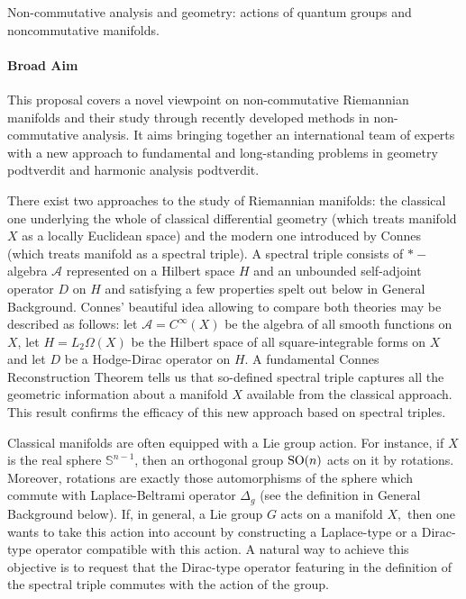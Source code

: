 \documentclass{article}
\newcommand{\archeading}[1]{\vspace{.3cm} \noindent{\bfseries #1} \vspace{.1cm}   }
\begin{document}
\parindent=20pt
\pagestyle{empty}
\newpage


\archeading{Project Title} Non-commutative analysis and geometry: actions of quantum groups and noncommutative manifolds.

\bigskip\archeading{Aims and Background}

\paragraph*{Broad Aim} This proposal covers a novel viewpoint on non-commutative Riemannian manifolds and their study through recently developed methods in non-commutative analysis. It aims bringing together an international team of experts with a new approach to fundamental and long-standing problems in geometry {\color{red} podtverdit} and harmonic analysis {\color{red} podtverdit}.

There exist two approaches to the study of Riemannian manifolds: the classical one underlying the whole of classical differential geometry (which treats manifold $X$ as a locally Euclidean space) and the modern one introduced by Connes (which treats manifold as a spectral triple).  A spectral triple consists of $\ast-$algebra $\mathcal{A}$ represented on a Hilbert space $H$ and an unbounded self-adjoint operator $D$ on $H$ and satisfying a few properties spelt out below in General Background. Connes' beautiful idea \cite{Connes-book} allowing to compare both theories may be described as follows: let  $\mathcal{A}=C^{\infty}(X)$ be the algebra of all smooth functions on $X$, let $H=L_2\Omega(X)$ be the Hilbert space of all square-integrable forms on $X$ and let $D$ be a Hodge-Dirac operator \cite{BGV} on $H$. A fundamental Connes Reconstruction Theorem \cite{Connes-reconstruction} tells us that so-defined spectral triple captures all the geometric information about a manifold $X$ available from the classical approach. This result confirms the efficacy of this new approach based on spectral triples.

Classical manifolds are often equipped with a Lie group action. For instance, if $X$ is the real sphere $\mathbb{S}^{n-1}$, then an orthogonal group ${\rm SO}(n)$ acts on it by rotations. Moreover, rotations are exactly those automorphisms of the sphere which commute with Laplace-Beltrami operator $\Delta_g$ (see the definition in General Background below). If, in general, a Lie group $G$ acts on a manifold $X,$ then one wants to take this action into account by constructing a Laplace-type or a Dirac-type operator compatible with this action. A natural way to achieve this objective is to request that the Dirac-type operator featuring in the definition of the spectral triple commutes with the action of the group.
\end{document}
